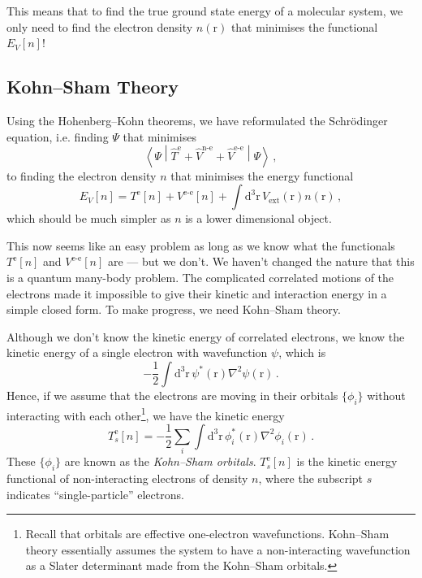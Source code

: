 \documentclass{article}
\theoremstyle{plain}\theoremheaderfont{\normalfont\itshape}\theorembodyfont{\rmfamily}\theoremseparator{.}\newtheorem*{rem}{Remark}\newtheorem*{ex}{Example}\newtheorem*{proof}{Proof}\newtheorem*{altp}{Alternative proof}
\theoremstyle{plain}\theoremheaderfont{\normalfont\bfseries}\theorembodyfont{\rmfamily}\theoremseparator{.}\newtheorem{thm}{Theorem}[section]\newtheorem{lem}[thm]{Lemma}\newtheorem{prop}[thm]{Proposition}\newtheorem*{cor}{Corollary}\newtheorem{defn}[thm]{Definition}\newtheorem{clm}[thm]{Claim}\newtheorem{clminproof}{Claim}\newtheorem{pos}{Postulate}[section]
\theoremstyle{break}\theoremheaderfont{\normalfont\itshape}\theorembodyfont{\rmfamily}\theoremseparator{.\medskip}\newtheorem*{proofskip}{Proof}\newtheorem*{exs}{Examples}\newtheorem*{rems}{Remarks}
\theoremstyle{break}\theoremheaderfont{\normalfont\bfseries}\theorembodyfont{\rmfamily}\theoremseparator{.\medskip}\newtheorem{lemskip}[thm]{Lemma}\newtheorem{defnskip}[thm]{Definition}\newtheorem{propskip}[thm]{Proposition}\newtheorem{thmskip}[thm]{Theorem}
\numberwithin{equation}{section}
\newcommand{\dd}[2][]{\mathrm{d}^{#1} #2\,}
\newcommand{\expval}[2]{\left\langle #2 \middle| #1 \middle| #2 \right\rangle}
\newcommand{\vb}[1]{\bm{\mathrm{#1}}}
\newcommand{\laplacian}{\nabla^2}
\newcommand{\e}{^{\text{e}}}
\begin{document}
    This means that to find the true ground state energy of a molecular system, we only need to find the electron density \(n(\vb{r})\) that minimises the functional \(E_V[n]\)!

    \subsection{Kohn--Sham Theory}
    Using the Hohenberg--Kohn theorems, we have reformulated the Schr\"{o}dinger equation, i.e. finding \(\Psi\) that minimises
    \begin{equation}
        \expval{\hat{T}\e+\hat{V}^{\text{n-e}}+\hat{V}^{\text{e-e}}}{\Psi}\,,
    \end{equation}
    to finding the electron density \(n\) that minimises the energy functional
    \begin{equation}
        E_V[n]=T\e[n]+V^{\text{e-e}}[n]+\int\dd[3]{\vb{r}}V_{\text{ext}}(\vb{r})n(\vb{r})\,,
    \end{equation}
    which should be much simpler as \(n\) is a lower dimensional object.

    This now seems like an easy problem as long as we know what the functionals \(T\e[n]\) and \(V^{\text{e-e}}[n]\) are --- but we don't. We haven't changed the nature that this is a quantum many-body problem. The complicated correlated motions of the electrons made it impossible to give their kinetic and interaction energy in a simple closed form. To make progress, we need Kohn--Sham theory.

    Although we don't know the kinetic energy of correlated electrons, we know the kinetic energy of a single electron with wavefunction \(\psi\), which is
    \begin{equation}
       -\frac{1}{2} \int\dd[3]{\vb{r}}\psi^*(\vb{r})\laplacian\psi(\vb{r})\,.
    \end{equation}
    Hence, if we assume that the electrons are moving in their orbitals \(\{\phi_i\}\) without interacting with each other\footnote{Recall that orbitals are effective one-electron wavefunctions. Kohn--Sham theory essentially assumes the system to have a non-interacting wavefunction as a Slater determinant made from the Kohn--Sham orbitals.}, we have the kinetic energy
    \begin{equation}
        T_s\e[n]=-\frac{1}{2}\sum_i\int\dd[3]{\vb{r}}\phi_i^*(\vb{r})\laplacian\phi_i(\vb{r})\,.
    \end{equation}
    These \(\{\phi_i\}\) are known as the \textit{Kohn--Sham orbitals}. \(T_s\e[n]\) is the kinetic energy functional of non-interacting electrons of density \(n\), where the subscript \(s\) indicates ``single-particle'' electrons.
\end{document}

